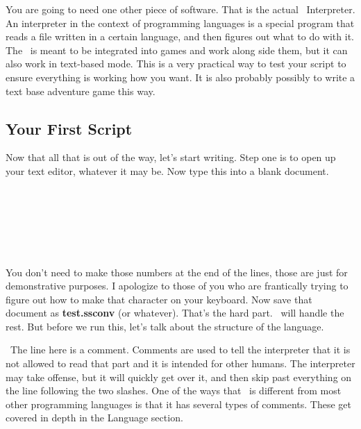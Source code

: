 You are going to need one other piece of software.  That is the actual \SSquared\ Interpreter.  An interpreter in the context of programming languages is a special program that reads a file written in a certain language, and then figures out what to do with it.  The \SSquared\ is meant to be integrated into games and work along side them, but it can also work in text-based mode.  This is a very practical way to test your script to ensure everything is working how you want.  It is also probably possibly to write a text base adventure game this way.

\subsection{Your First Script}

Now that all that is out of the way, let's start writing.  Step one is to open up your text editor, whatever it may be.  Now type this into a blank document.  

\begin{SSCodeBox}
  \\
  \\
\scitea{} \\
\scitea{\{}  \\
\scitea{;}  \\
\scitea{\}}
\end{SSCodeBox}

You don't need to make those numbers at the end of the lines, those are just for demonstrative purposes.  I apologize to those of you who are frantically trying to figure out how to make that character on your keyboard.  Now save that document as \textbf{test.ssconv} (or whatever).  That's the hard part.  \SSquared\ will handle the rest. But before we run this, let's talk about the structure of the language.  

\ The line here is a comment. Comments are used to tell the interpreter that it is not allowed to read that part and it is intended for other humans.  The interpreter may take offense, but it will quickly get over it, and then skip past everything on the line following the two slashes.  One of the ways that \SSquared\ is different from most other programming languages is that it has several types of comments.  These get covered in depth in the Language section.

